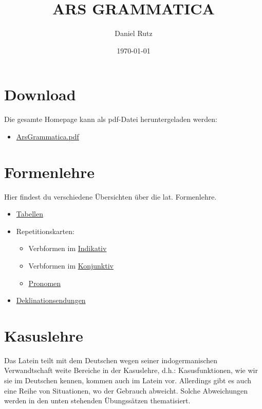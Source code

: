 \documentclass{scrartcl}
\author{Daniel Rutz}
\date{\today}
\title{ARS GRAMMATICA}
\begin{document}
\maketitle


\section{Download}
\label{sec:org1e6a31b}
Die gesamte Homepage kann als pdf-Datei heruntergeladen werden:
\begin{itemize}
\item \href{https://www.dropbox.com/s/uectc7lycjd2119/ArsGrammatica.pdf?dl=0}{ArsGrammatica.pdf}
\end{itemize}

\section{Formenlehre}
\label{sec:orga77d0f8}
Hier findest du verschiedene Übersichten über die lat. 
Formenlehre.

\begin{itemize}
\item \href{https://www.dropbox.com/s/6mg0r0cdojb8uj4/GrammaticaLatina\_Formenlehre.pdf?dl=0}{Tabellen}
\item Repetitionskarten:
\begin{itemize}
\item Verbformen im \href{https://www.dropbox.com/s/nwnbpxhokzbotzx/RepetitionskartenFormellehreLateinIndikativ.pdf?dl=0}{Indikativ}
\item Verbformen im \href{https://www.dropbox.com/s/rew7e8ofvfnxeup/RepetitionskartenFormellehreLateinKonjunktiv.pdf?dl=0}{Konjunktiv}
\item \href{https://www.dropbox.com/s/pxnj7f8e4cacyuv/RepetitionskartenFormellehreLateinPronomina.pdf?dl=0}{Pronomen}
\end{itemize}
\item \href{https://www.dropbox.com/s/gnpg12fmmq5tkj8/Deklinationen\_\%C3\%9Cbersicht\_Gentium.pdf?dl=0}{Deklinationsendungen}
\end{itemize}

\section{Kasuslehre}
\label{sec:orgf53dd94}
Das Latein teilt mit dem Deutschen wegen seiner indogermanischen
Verwandtschaft weite Bereiche in der Kasuslehre, d.h.:
Kasusfunktionen, wie wir sie im Deutschen kennen, kommen auch im
Latein vor. Allerdings gibt es auch eine Reihe von Situationen, wo der
Gebrauch abweicht. Solche Abweichungen werden in den unten stehenden
Übungssätzen thematisiert. 
\end{document}
